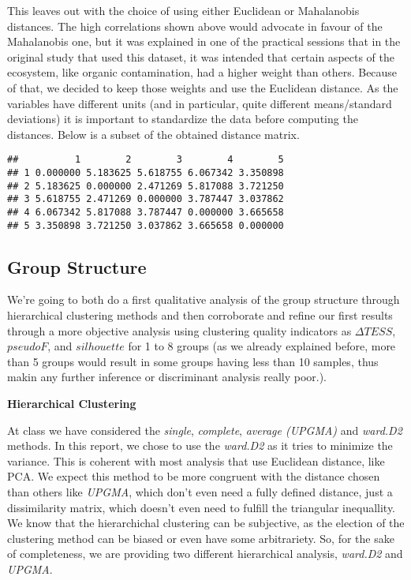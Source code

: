 \documentclass[]{article}
\begin{document}
This leaves out with the choice of using either Euclidean or Mahalanobis
distances. The high correlations shown above would advocate in favour of
the Mahalanobis one, but it was explained in one of the practical
sessions that in the original study that used this dataset, it was
intended that certain aspects of the ecosystem, like organic
contamination, had a higher weight than others. Because of that, we
decided to keep those weights and use the Euclidean distance. As the
variables have different units (and in particular, quite different
means/standard deviations) it is important to standardize the data
before computing the distances. Below is a subset of the obtained
distance matrix.

\begin{verbatim}
##          1        2        3        4        5
## 1 0.000000 5.183625 5.618755 6.067342 3.350898
## 2 5.183625 0.000000 2.471269 5.817088 3.721250
## 3 5.618755 2.471269 0.000000 3.787447 3.037862
## 4 6.067342 5.817088 3.787447 0.000000 3.665658
## 5 3.350898 3.721250 3.037862 3.665658 0.000000
\end{verbatim}

\subsection{Group Structure}\label{group-structure}

We're going to both do a first qualitative analysis of the group
structure through hierarchical clustering methods and then corroborate
and refine our first results through a more objective analysis using
clustering quality indicators as \(\Delta TESS\), \(pseudoF\), and
\(silhouette\) for 1 to 8 groups (as we already explained before, more
than 5 groups would result in some groups having less than 10 samples,
thus makin any further inference or discriminant analysis really poor.).

\textbf{Hierarchical Clustering}

At class we have considered the \emph{single}, \emph{complete},
\emph{average (UPGMA)} and \emph{ward.D2} methods. In this report, we
chose to use the \emph{ward.D2} as it tries to minimize the variance.
This is coherent with most analysis that use Euclidean distance, like
PCA. We expect this method to be more congruent with the distance chosen
than others like \emph{UPGMA}, which don't even need a fully defined
distance, just a dissimilarity matrix, which doesn't even need to
fulfill the triangular inequallity. We know that the hierarchichal
clustering can be subjective, as the election of the clustering method
can be biased or even have some arbitrariety. So, for the sake of
completeness, we are providing two different hierarchical analysis,
\emph{ward.D2} and \emph{UPGMA}.
\end{document}
